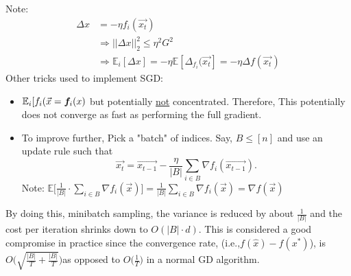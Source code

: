 \documentclass[12pt]{article}
\begin{document}
Note: 
\begin{align*}
\Delta x &= -\eta f_i(\vec{x_t})\\
&\Rightarrow || \Delta x||_2^2 \leq \eta^2 G^2\\
&\Rightarrow \mathbb{E}_i[\Delta x] = -\eta \mathbb{E}[\Delta_{f_i}(\vec{ x_t}] = -\eta	\Delta f(\vec{x_t})
\end{align*}
Other tricks used to implement SGD: 
\begin{itemize}
\item $\mathbb{E}_i [f_i(\vec{x} = {\boldsymbol f}_i(x) $ but potentially \underline{not} concentrated. Therefore, This potentially does not converge as fast as performing the full gradient. 
\item To improve further, Pick a "batch" of indices. Say, $B \leq [n]$ and use an update rule such that
$$
\vec{x_t} = \vec{x_{t-1}} - \frac{\eta}{|B|} \sum_{i \in B} \nabla f_i(\vec{x_{t-1}}).
$$
Note: $ \mathbb{E}\bigg[ \frac{1}{|B|}\cdot \sum_{i \in B} \nabla f_i(\vec{x})\bigg] = \frac{1}{|B|}\sum_{i \in B}  \nabla f_i(\vec{x} )=\nabla f(\vec{x} ) $
\end{itemize}
By doing this, minibatch sampling, the variance is reduced by about $\frac{1}{|B|}$ and the cost per iteration shrinks down to $O(|B|\cdot d)$. This is considered a good compromise in practice since the convergence rate, (i.e.,$f(\hat{x}) -f(x^*)$), is  $O\bigg(\sqrt{\frac{|B|}{T} + \frac{|B|}{T}} \bigg)$as opposed to $O\big(\frac{1}{T} \big)$ in a normal GD algorithm.
\end{document}

